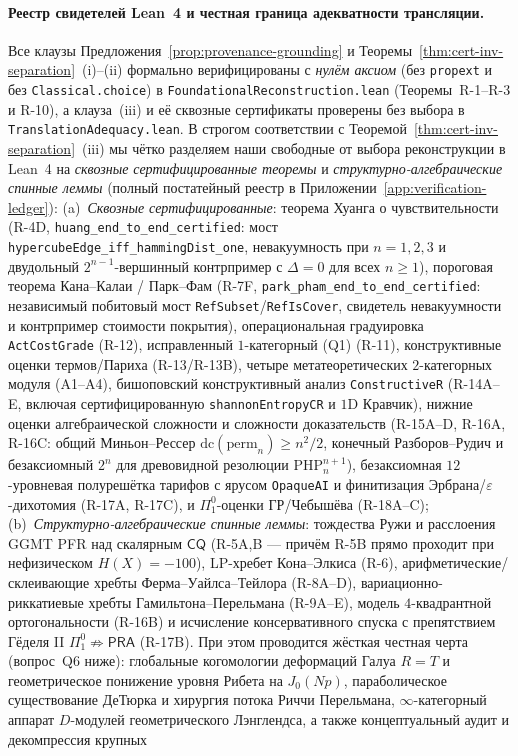 \documentclass[11pt]{article}
\theoremstyle{plain}
\theoremstyle{definition}
\begin{document}
\paragraph{Реестр свидетелей Lean~4 и честная граница адекватности трансляции.}
Все клаузы Предложения~\ref{prop:provenance-grounding} и Теоремы~\ref{thm:cert-inv-separation}~(i)--(ii) формально верифицированы с \emph{нулём аксиом} (без \texttt{propext} и без \texttt{Classical.choice}) в \texttt{FoundationalReconstruction.lean} (Теоремы~R-1--R-3 и R-10), а клауза~(iii) и её сквозные сертификаты проверены без выбора в \texttt{TranslationAdequacy.lean}. В строгом соответствии с Теоремой~\ref{thm:cert-inv-separation}~(iii) мы чётко разделяем наши свободные от выбора реконструкции в Lean~4 на \emph{сквозные сертифицированные теоремы} и \emph{структурно-алгебраические спинные леммы} (полный постатейный реестр в Приложении~\ref{app:verification-ledger}): (a)~\emph{Сквозные сертифицированные}: теорема Хуанга о чувствительности (R-4D, \texttt{huang\_\allowbreak end\_\allowbreak to\_\allowbreak end\_\allowbreak certified}: мост \texttt{hypercubeEdge\_\allowbreak iff\_\allowbreak hammingDist\_\allowbreak one}, невакуумность при $n = 1,2,3$ и двудольный $2^{n-1}$-вершинный контрпример с $\Delta = 0$ для всех $n \ge 1$), пороговая теорема Кана--Калаи / Парк--Фам (R-7F, \texttt{park\_\allowbreak pham\_\allowbreak end\_\allowbreak to\_\allowbreak end\_\allowbreak certified}: независимый побитовый мост \texttt{RefSubset}/\texttt{RefIsCover}, свидетель невакуумности и контрпример стоимости покрытия), операциональная градуировка \texttt{ActCostGrade} (R-12), исправленный $1$-категорный (Q1) (R-11), конструктивные оценки термов/Париха (R-13/R-13B), четыре метатеоретических $2$-категорных модуля (A1--A4), бишоповский конструктивный анализ \texttt{ConstructiveR} (R-14A--E, включая сертифицированную \texttt{shannonEntropyCR} и $1$D Кравчик), нижние оценки алгебраической сложности и сложности доказательств (R-15A--D, R-16A, R-16C: общий Миньон--Рессер $\mathrm{dc}(\mathrm{perm}_n)\ge n^2/2$, конечный Разборов--Рудич и безаксиомный $2^n$ для древовидной резолюции $\mathrm{PHP}_n^{n+1}$), безаксиомная $12$-уровневая полурешётка тарифов с ярусом \texttt{OpaqueAI} и финитизация Эрбрана/$\varepsilon$-дихотомия (R-17A, R-17C), и $\Pi^0_1$-оценки ГР/Чебышёва (R-18A--C); (b)~\emph{Структурно-алгебраические спинные леммы}: тождества Ружи и расслоения GGMT PFR над скалярным $\mathsf{CQ}$ (R-5A,B --- причём R-5B прямо проходит при нефизическом $H(X) = -100$), LP-хребет Кона--Элкиса (R-6), арифметические/склеивающие хребты Ферма--Уайлса--Тейлора (R-8A--D), вариационно-риккатиевые хребты Гамильтона--Перельмана (R-9A--E), модель $4$-квадрантной ортогональности (R-16B) и исчисление консервативного спуска с препятствием Гёделя II $\Pi^0_1\not\Rightarrow\mathsf{PRA}$ (R-17B). При этом проводится жёсткая честная черта (вопрос~Q6 ниже): глобальные когомологии деформаций Галуа $R = T$ и геометрическое понижение уровня Рибета на $J_0(Np)$, параболическое существование ДеТюрка и хирургия потока Риччи Перельмана, $\infty$-категорный аппарат $D$-модулей геометрического Лэнглендса, а также концептуальный аудит и декомпрессия крупных 
\end{document}
